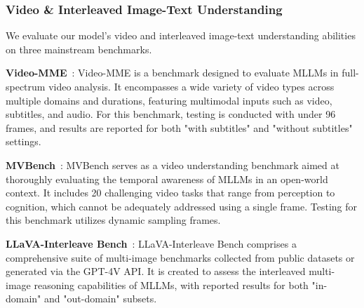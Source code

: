



\subsubsection{Video \& Interleaved Image-Text Understanding}

We evaluate our model's video and interleaved image-text understanding abilities on three mainstream benchmarks.

\textbf{Video-MME}~\cite{fu2024video}: Video-MME is a benchmark designed to evaluate MLLMs in full-spectrum video analysis. It encompasses a wide variety of video types across multiple domains and durations, featuring multimodal inputs such as video, subtitles, and audio. For this benchmark, testing is conducted with under 96 frames, and results are reported for both "with subtitles" and "without subtitles" settings.

\textbf{MVBench}~\cite{li2024mvbench}: MVBench serves as a video understanding benchmark aimed at thoroughly evaluating the temporal awareness of MLLMs in an open-world context. It includes 20 challenging video tasks that range from perception to cognition, which cannot be adequately addressed using a single frame. Testing for this benchmark utilizes dynamic sampling frames.

\textbf{LLaVA-Interleave Bench}~\cite{llava-next_2024}: LLaVA-Interleave Bench comprises a comprehensive suite of multi-image benchmarks collected from public datasets or generated via the GPT-4V API. It is created to assess the interleaved multi-image reasoning capabilities of MLLMs, with reported results for both "in-domain" and "out-domain" subsets.

